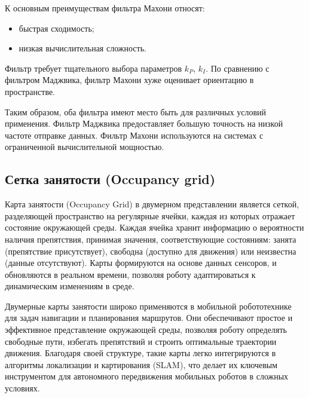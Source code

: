 {К основным преимуществам фильтра Махони относят:
\begin{itemize}
	\item быстрая сходимость;
	\item низкая вычислительная сложность.
\end{itemize}

Фильтр требует тщательного выбора параметров \(k_P\), \(k_I\). По сравнению с фильтром Маджвика, 
фильтр Махони хуже оценивает ориентацию в пространстве.


Таким образом, оба фильтра имеют место быть для различных условий применения.
Фильтр Маджвика предоставляет большую точность на низкой частоте отправке данных.
Фильтр Махони используются на системах с ограниченной вычислительной мощностью.

%
%

\subsection{Сетка занятости (Occupancy grid)}

Карта занятости (Occupancy Grid) в двумерном представлении является сеткой,
разделяющей пространство на регулярные ячейки, каждая из которых отражает
состояние окружающей среды. Каждая ячейка хранит информацию о вероятности
наличия препятствия, принимая значения, соответствующие состояниям: занята
(препятствие присутствует), свободна (доступно для движения) или неизвестна
(данные отсутствуют). Карты формируются на основе данных сенсоров, и обновляются
в реальном времени, позволяя роботу адаптироваться к динамическим изменениям в
среде.

Двумерные карты занятости широко применяются в мобильной робототехнике для задач
навигации и планирования маршрутов. Они обеспечивают простое и эффективное
представление окружающей среды, позволяя роботу определять свободные пути,
избегать препятствий и строить оптимальные траектории движения. Благодаря своей
структуре, такие карты легко интегрируются в алгоритмы локализации и
картирования (SLAM), что делает их ключевым инструментом для автономного
передвижения мобильных роботов в сложных условиях.

}
